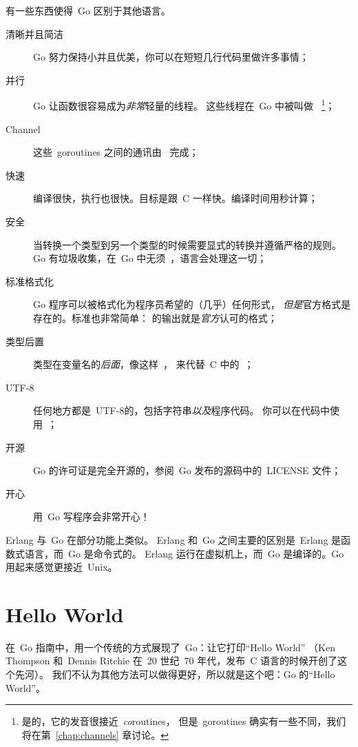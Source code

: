 \noindent{}有一些东西使得~Go 区别于其他语言。
\begin{description}
\item[清晰并且简洁]
Go 努力保持小并且优美，你可以在短短几行代码里做许多事情；

\item[并行]
Go 让函数很容易成为\emph{非常}轻量的线程。
这些线程在~Go 中被叫做~ 
\footnote{是的，它的发音很接近~\emph{co}routines，
但是~goroutines 确实有一些不同，我们将在第~\ref{chap:channels} 章讨论。}；

\item[Channel]
这些~goroutines 之间的通讯由~\cite{hoare, csp} 完成；

\item[快速]
编译很快，执行也很快。目标是跟~C 一样快。编译时间用秒计算；

\item[安全]
当转换一个类型到另一个类型的时候需要显式的转换并遵循严格的规则。
Go 有垃圾收集，在~Go 中无须~，语言会处理这一切；

\item[标准格式化]
Go 程序可以被格式化为程序员希望的（几乎）任何形式，
\emph{但是}官方格式是存在的。标准也非常简单：
 的输出就是\emph{官方}认可的格式；

\item[类型后置]
类型在变量名的\emph{后面}，像这样~，
来代替~C 中的~；

\item[UTF-8]
任何地方都是~UTF-8的，包括字符串\emph{以及}程序代码。 
你可以在代码中使用~；

\item[开源]
Go 的许可证是完全开源的，参阅~Go 发布的源码中的~LICENSE 文件；

\item[开心]
用~Go 写程序会非常开心！

\end{description}
Erlang\cite{erlang} 与~Go 在部分功能上类似。
Erlang 和~Go 之间主要的区别是~Erlang 是函数式语言，而~Go 是命令式的。
Erlang 运行在虚拟机上，而~Go 是编译的。Go 用起来感觉更接近~Unix。

\section{Hello World}
\label{sec:hello world}
在~Go 指南中，用一个传统的方式展现了~Go：让它打印``Hello World''
（Ken Thompson 和~Dennis Ritchie 在~20 世纪~70 年代，发布~C 语言的时候开创了这个先河）。
我们不认为其他方法可以做得更好，所以就是这个吧：Go 的``Hello World''。

